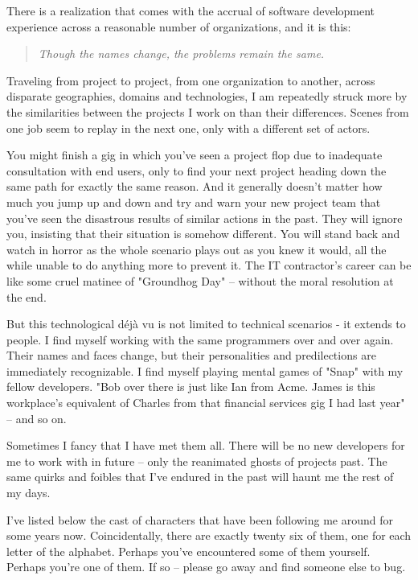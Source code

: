 \documentclass{article}
\begin{document}
There is a realization that comes with the accrual of software
development experience across a reasonable number of organizations, and
it is this:

\begin{quote}
\emph{Though the names change, the problems remain the same.}
\end{quote}

Traveling from project to project, from one organization to another,
across disparate geographies, domains and technologies, I am repeatedly
struck more by the similarities between the projects I work on than
their differences. Scenes from one job seem to replay in the next one,
only with a different set of actors.

You might finish a gig in which you've seen a project flop due to
inadequate consultation with end users, only to find your next project
heading down the same path for exactly the same reason. And it generally
doesn't matter how much you jump up and down and try and warn your new
project team that you've seen the disastrous results of similar actions
in the past. They will ignore you, insisting that their situation is
somehow different. You will stand back and watch in horror as the whole
scenario plays out as you knew it would, all the while unable to do
anything more to prevent it. The IT contractor's career can be like some
cruel matinee of "Groundhog Day" -- without the moral resolution at the
end.

But this technological déjà vu is not limited to technical scenarios -
it extends to people. I find myself working with the same programmers
over and over again. Their names and faces change, but their
personalities and predilections are immediately recognizable. I find
myself playing mental games of "Snap" with my fellow developers. "Bob
over there is just like Ian from Acme. James is this workplace's
equivalent of Charles from that financial services gig I had last year"
-- and so on.

Sometimes I fancy that I have met them all. There will be no new
developers for me to work with in future -- only the reanimated ghosts
of projects past. The same quirks and foibles that I've endured in the
past will haunt me the rest of my days.

I've listed below the cast of characters that have been following me
around for some years now. Coincidentally, there are exactly twenty six
of them, one for each letter of the alphabet. Perhaps you've encountered
some of them yourself. Perhaps you're one of them. If so -- please go
away and find someone else to bug.
\end{document}
